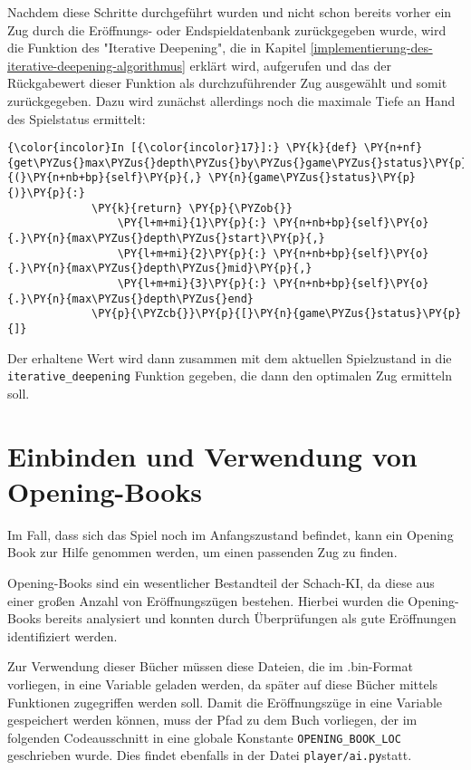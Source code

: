 Nachdem diese Schritte durchgeführt wurden und nicht schon bereits
vorher ein Zug durch die Eröffnungs- oder Endspieldatenbank
zurückgegeben wurde, wird die Funktion des "Iterative Deepening", die in
Kapitel \ref{implementierung-des-iterative-deepening-algorithmus} erklärt wird, aufgerufen und das der Rückgabewert dieser
Funktion als durchzuführender Zug ausgewählt und somit zurückgegeben.
Dazu wird zunächst allerdings noch die maximale Tiefe an Hand des
Spielstatus ermittelt:

    \begin{Verbatim}[commandchars=\\\{\}]
{\color{incolor}In [{\color{incolor}17}]:} \PY{k}{def} \PY{n+nf}{get\PYZus{}max\PYZus{}depth\PYZus{}by\PYZus{}game\PYZus{}status}\PY{p}{(}\PY{n+nb+bp}{self}\PY{p}{,} \PY{n}{game\PYZus{}status}\PY{p}{)}\PY{p}{:}
             \PY{k}{return} \PY{p}{\PYZob{}}
                 \PY{l+m+mi}{1}\PY{p}{:} \PY{n+nb+bp}{self}\PY{o}{.}\PY{n}{max\PYZus{}depth\PYZus{}start}\PY{p}{,} 
                 \PY{l+m+mi}{2}\PY{p}{:} \PY{n+nb+bp}{self}\PY{o}{.}\PY{n}{max\PYZus{}depth\PYZus{}mid}\PY{p}{,}
                 \PY{l+m+mi}{3}\PY{p}{:} \PY{n+nb+bp}{self}\PY{o}{.}\PY{n}{max\PYZus{}depth\PYZus{}end}
             \PY{p}{\PYZcb{}}\PY{p}{[}\PY{n}{game\PYZus{}status}\PY{p}{]}
\end{Verbatim}

    Der erhaltene Wert wird dann zusammen mit dem aktuellen Spielzustand in
die \texttt{iterative\_deepening} Funktion gegeben, die dann den
optimalen Zug ermitteln soll.

    \section{Einbinden und Verwendung von
Opening-Books}\label{einbinden-und-verwendung-von-opening-books}

Im Fall, dass sich das Spiel noch im Anfangszustand befindet, kann ein
Opening Book zur Hilfe genommen werden, um einen passenden Zug zu
finden.

Opening-Books sind ein wesentlicher Bestandteil der Schach-KI, da diese
aus einer großen Anzahl von Eröffnungszügen bestehen. Hierbei wurden die
Opening-Books bereits analysiert und konnten durch Überprüfungen als
gute Eröffnungen identifiziert werden.

Zur Verwendung dieser Bücher müssen diese Dateien, die im .bin-Format
vorliegen, in eine Variable geladen werden, da später auf diese Bücher
mittels Funktionen zugegriffen werden soll. Damit die Eröffnungszüge in
eine Variable gespeichert werden können, muss der Pfad zu dem Buch
vorliegen, der im folgenden Codeausschnitt in eine globale Konstante
\texttt{OPENING\_BOOK\_LOC} geschrieben wurde. Dies findet ebenfalls in
der Datei \texttt{player/ai.py}statt.

